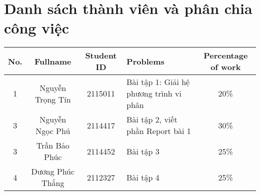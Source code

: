 \section{Danh sách thành viên và phân chia công việc}

\begin{center}
\begin{tabular}{|c|c|c|l|c|}
\hline
\textbf{No.} & \textbf{Fullname} & \textbf{Student ID} & \textbf{Problems} & \textbf{Percentage of work}\\
\hline 
\multirow{3}{*}{1} & \multirow{3}{*}{Nguyễn Trọng Tín} & \multirow{3}{*}{2115011} & \multirow{3}{*}{Bài tập 1: Giải hệ phương trình vi phân} & \multirow{3}{*}{20\%}\\
 & &  & &\\
 & &  & &\\
\hline
\multirow{3}{*}{3} & \multirow{3}{*}{Nguyễn Ngọc Phú} & \multirow{3}{*}{2114417} & \multirow{3}{*}{Bài tập 2, viết phần Report bài 1} & \multirow{3}{*}{30\%}\\
 & &  & &\\
 & &  & &\\
\hline
\multirow{3}{*}{3} & \multirow{3}{*}{Trần Bảo Phúc} & \multirow{3}{*}{2114452} & \multirow{3}{*}{Bài tập 3} & \multirow{3}{*}{25\%}\\
 & &  & &\\
 & &  & &\\
\hline
\multirow{3}{*}{4} & \multirow{3}{*}{Dương Phúc Thắng} & \multirow{3}{*}{2112327} & \multirow{3}{*}{Bài tập 4} & \multirow{3}{*}{25\%}\\
 & &  & &\\
 & &  & &\\
\hline
\end{tabular}
\end{center}
